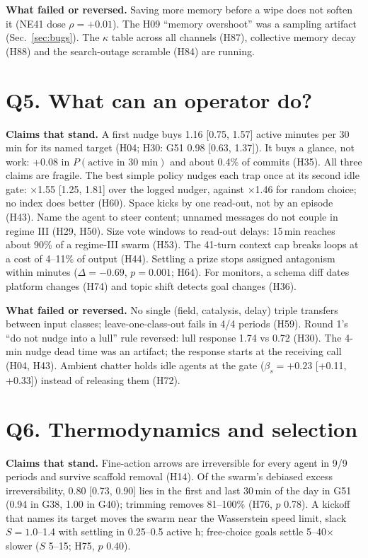 \documentclass[aps,pre,reprint,10pt,nofootinbib]{revtex4-2}
\begin{document}
\textbf{What failed or reversed.} Saving more memory before a wipe does not soften it (NE41 dose $\rho=+0.01$). The H09 ``memory overshoot'' was a sampling artifact (Sec.~\ref{sec:bugs}). The $\kappa$ table across all channels (H87), collective memory decay (H88) and the search-outage scramble (H84) are running.

\section{Q5. What can an operator do?}
\textbf{Claims that stand.} A first nudge buys 1.16 [0.75, 1.57] active minutes per 30\,min for its named target (H04; H30: G51 0.98 [0.63, 1.37]). It buys a glance, not work: +0.08 in $P(\text{active in 30 min})$ and about 0.4\% of commits (H35). All three claims are fragile. The best simple policy nudges each trap once at its second idle gate: $\times$1.55 [1.25, 1.81] over the logged nudger, against $\times$1.46 for random choice; no index does better (H60). Space kicks by one read-out, not by an episode (H43). Name the agent to steer content; unnamed messages do not couple in regime III (H29, H50). Size vote windows to read-out delays: 15\,min reaches about 90\% of a regime-III swarm (H53). The 41-turn context cap breaks loops at a cost of 4--11\% of output (H44). Settling a prize stops assigned antagonism within minutes ($\Delta=-0.69$, $p=0.001$; H64). For monitors, a schema diff dates platform changes (H74) and topic shift detects goal changes (H36).

\textbf{What failed or reversed.} No single (field, catalysis, delay) triple transfers between input classes; leave-one-class-out fails in 4/4 periods (H59). Round 1's ``do not nudge into a lull'' rule reversed: lull response 1.74 vs 0.72 (H30). The 4-min nudge dead time was an artifact; the response starts at the receiving call (H04, H43). Ambient chatter holds idle agents at the gate ($\beta_s=+0.23$ [+0.11, +0.33]) instead of releasing them (H72).

\section{Q6. Thermodynamics and selection}
\textbf{Claims that stand.} Fine-action arrows are irreversible for every agent in 9/9 periods and survive scaffold removal (H14). Of the swarm's debiased excess irreversibility, 0.80 [0.73, 0.90] lies in the first and last 30\,min of the day in G51 (0.94 in G38, 1.00 in G40); trimming removes 81--100\% (H76, $p$ 0.78). A kickoff that names its target moves the swarm near the Wasserstein speed limit, slack $S=1.0$--1.4 with settling in 0.25--0.5 active h; free-choice goals settle 5--40$\times$ slower ($S$ 5--15; H75, $p$ 0.40).
\end{document}
